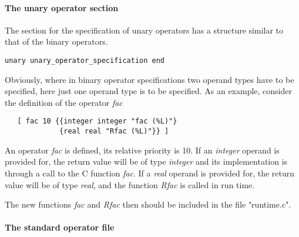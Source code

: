 \documentclass[11pt]{article}
\begin{document}
\paragraph{The unary operator section}
The section for the specification of unary operators has a structure
similar to that of the binary operators.
{\footnotesize
\begin{verbatim}
unary unary_operator_specification end
\end{verbatim}
}
Obviously, where in binary operator specifications two operand types
have to be specified, here just one operand type is to
be specified.
As an example, consider the definition of the operator {\em fac}
{\footnotesize
\begin{verbatim}
   [ fac 10 {{integer integer "fac (%L)"}
             {real real "Rfac (%L)"}} ]
\end{verbatim}
}
An operator {\em fac} is defined, its relative priority is 10.
If an {\em integer}
operand is provided for, the return value will be of type {\em integer}
and its implementation is through a call to the C function {\em fac}. If
a  {\em real} operand is provided for, the return value will be of type
{\em real}, and the function {\em Rfac} is called in run time.

The new functions {\em fac} and {\em Rfac} then should be included in the file "runtime.c".
\paragraph{The standard operator file}
\end{document}
